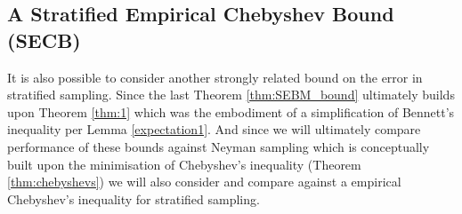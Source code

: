 \subsection{A Stratified Empirical Chebyshev Bound (SECB)}\label{subsection:SECB}

It is also possible to consider another strongly related bound on the error in stratified sampling.
Since the last Theorem \ref{thm:SEBM_bound} ultimately builds upon Theorem \ref{thm:1} which was the embodiment of a simplification of Bennett's inequality per Lemma \ref{expectation1}.
And since we will ultimately compare performance of these bounds against Neyman sampling which is conceptually built upon the minimisation of Chebyshev's inequality (Theorem \ref{thm:chebyshevs}) we will also consider and compare against a empirical Chebyshev's inequality for stratified sampling.


